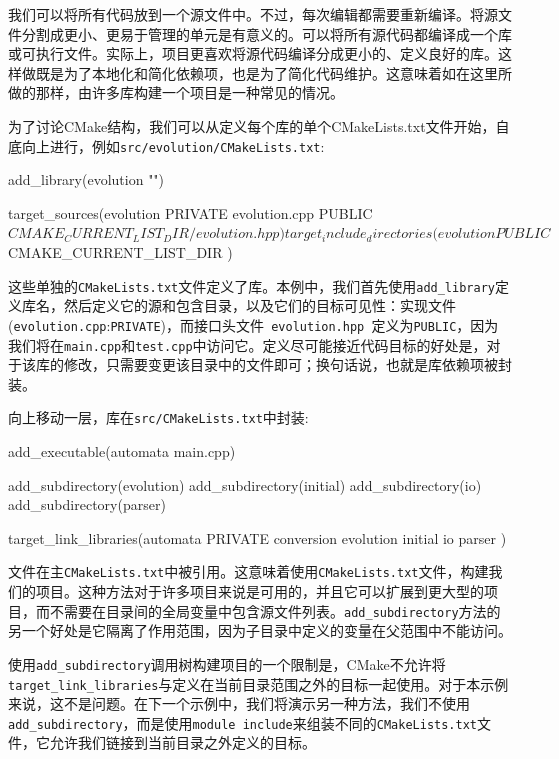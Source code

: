 
我们可以将所有代码放到一个源文件中。不过，每次编辑都需要重新编译。将源文件分割成更小、更易于管理的单元是有意义的。可以将所有源代码都编译成一个库或可执行文件。实际上，项目更喜欢将源代码编译分成更小的、定义良好的库。这样做既是为了本地化和简化依赖项，也是为了简化代码维护。这意味着如在这里所做的那样，由许多库构建一个项目是一种常见的情况。

为了讨论CMake结构，我们可以从定义每个库的单个CMakeLists.txt文件开始，自底向上进行，例如\texttt{src/evolution/CMakeLists.txt}:

\begin{codebox}[cmake]
add_library(evolution "")

target_sources(evolution
  PRIVATE
    evolution.cpp
  PUBLIC
    ${CMAKE_CURRENT_LIST_DIR}/evolution.hpp
  )
  
target_include_directories(evolution
  PUBLIC
    ${CMAKE_CURRENT_LIST_DIR}
  )
\end{codebox}

这些单独的\texttt{CMakeLists.txt}文件定义了库。本例中，我们首先使用\texttt{add\_library}定义库名，然后定义它的源和包含目录，以及它们的目标可见性：实现文件(\texttt{evolution.cpp}:\texttt{PRIVATE})，而接口头文件\texttt{ evolution.hpp }定义为\texttt{PUBLIC}，因为我们将在\texttt{main.cpp}和\texttt{test.cpp}中访问它。定义尽可能接近代码目标的好处是，对于该库的修改，只需要变更该目录中的文件即可；换句话说，也就是库依赖项被封装。

向上移动一层，库在\texttt{src/CMakeLists.txt}中封装:

\begin{codebox}[cmake]
add_executable(automata main.cpp)

add_subdirectory(evolution)
add_subdirectory(initial)
add_subdirectory(io)
add_subdirectory(parser)

target_link_libraries(automata
  PRIVATE
    conversion
    evolution
    initial
    io
    parser
  )
\end{codebox}

文件在主\texttt{CMakeLists.txt}中被引用。这意味着使用\texttt{CMakeLists.txt}文件，构建我们的项目。这种方法对于许多项目来说是可用的，并且它可以扩展到更大型的项目，而不需要在目录间的全局变量中包含源文件列表。\texttt{add\_subdirectory}方法的另一个好处是它隔离了作用范围，因为子目录中定义的变量在父范围中不能访问。


使用\texttt{add\_subdirectory}调用树构建项目的一个限制是，CMake不允许将\texttt{target\_link\_libraries}与定义在当前目录范围之外的目标一起使用。对于本示例来说，这不是问题。在下一个示例中，我们将演示另一种方法，我们不使用\texttt{add\_subdirectory}，而是使用\texttt{module include}来组装不同的\texttt{CMakeLists.txt}文件，它允许我们链接到当前目录之外定义的目标。


